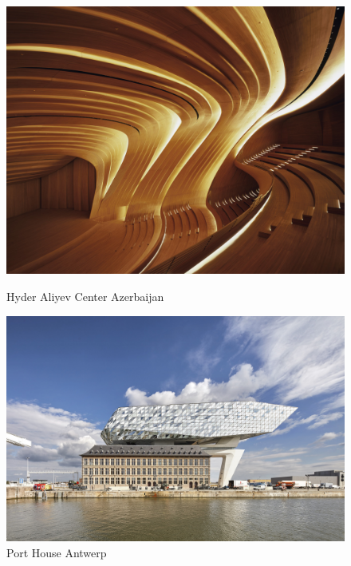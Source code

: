 \documentclass{article}
\begin{document}
    \label{sec:hadid}
    \begin{figure}[H]
        \begin{minipage}{0.4\textwidth}
           \centering
           \vfill
           \includegraphics[width=\linewidth]{figures/beispiele/architektur/hyder-aliyev-hadid.jpg}
           \caption{Hyder Aliyev Center Azerbaijan}
           \label{fig:hadid-1}
        \end{minipage}
            \hfill
        \begin{minipage}{0.4\textwidth}
           \centering
           \vfill
           \includegraphics[width=\linewidth]{figures/beispiele/architektur/antwep-port-house.jpg}
           \caption{Port House Antwerp}
           \label{fig:hadid-2}
        \end{minipage}
    \end{figure}
\end{document}
